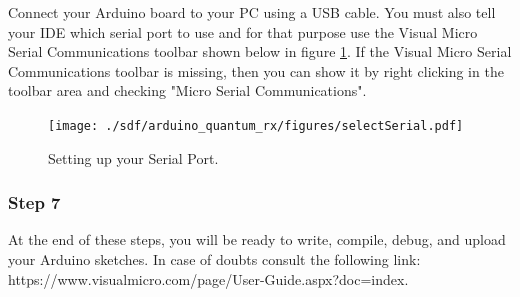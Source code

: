 \begin{refsection}
	Connect your Arduino board to your PC using a USB cable. You must also tell your IDE which serial port to use and for that purpose use the Visual Micro Serial Communications toolbar shown below in figure \ref{selectSerial}. If the Visual Micro Serial Communications toolbar is missing, then you can show it by right clicking in the toolbar area and checking "Micro Serial Communications".
	
	\begin{figure}[H]
		\centering
		\texttt{[image: ./sdf/arduino\_quantum\_rx/figures/selectSerial.pdf]}
		\caption{Setting up your Serial Port.} 
		\label{selectSerial}
	\end{figure}
	
	\subsubsection{Step 7}
	At the end of these steps, you will be ready to write, compile, debug, and upload your Arduino sketches. In case of doubts consult the following link: https://www.visualmicro.com/page/User-Guide.aspx?doc=index.
	

    
	
	
	\clearpage
	\printbibliography[heading=subbibliography]
\end{refsection}
\cleardoublepage
